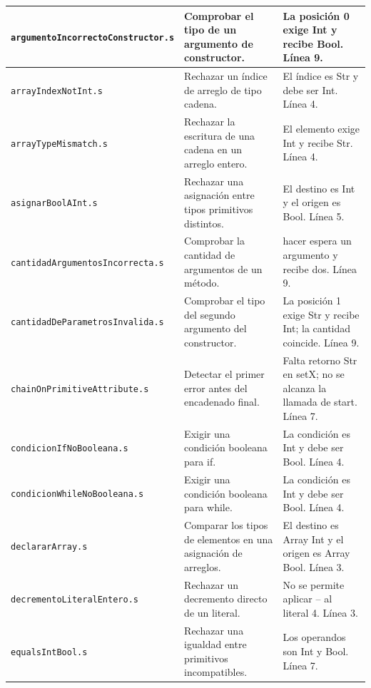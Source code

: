 \begin{longtable}{|>{\raggedright\arraybackslash}p{}|>{\raggedright\arraybackslash}p{}|>{\raggedright\arraybackslash}p{}|}
\texttt{argumento\allowbreak Incorrecto\allowbreak Constructor.s} & Comprobar el tipo de un argumento de constructor. & La posición 0 exige Int y recibe Bool. Línea 9. \\ \hline
\texttt{array\allowbreak Index\allowbreak Not\allowbreak Int.s} & Rechazar un índice de arreglo de tipo cadena. & El índice es Str y debe ser Int. Línea 4. \\ \hline
\texttt{array\allowbreak Type\allowbreak Mismatch.s} & Rechazar la escritura de una cadena en un arreglo entero. & El elemento exige Int y recibe Str. Línea 4. \\ \hline
\texttt{asignar\allowbreak Bool\allowbreak AInt.s} & Rechazar una asignación entre tipos primitivos distintos. & El destino es Int y el origen es Bool. Línea 5. \\ \hline
\texttt{cantidad\allowbreak Argumentos\allowbreak Incorrecta.s} & Comprobar la cantidad de argumentos de un método. & hacer espera un argumento y recibe dos. Línea 9. \\ \hline
\texttt{cantidad\allowbreak De\allowbreak Parametros\allowbreak Invalida.s} & Comprobar el tipo del segundo argumento del constructor. & La posición 1 exige Str y recibe Int; la cantidad coincide. Línea 9. \\ \hline
\texttt{chain\allowbreak On\allowbreak Primitive\allowbreak Attribute.s} & Detectar el primer error antes del encadenado final. & Falta retorno Str en setX; no se alcanza la llamada de start. Línea 7. \\ \hline
\texttt{condicion\allowbreak If\allowbreak No\allowbreak Booleana.s} & Exigir una condición booleana para if. & La condición es Int y debe ser Bool. Línea 4. \\ \hline
\texttt{condicion\allowbreak While\allowbreak No\allowbreak Booleana.s} & Exigir una condición booleana para while. & La condición es Int y debe ser Bool. Línea 4. \\ \hline
\texttt{declarar\allowbreak Array.s} & Comparar los tipos de elementos en una asignación de arreglos. & El destino es Array Int y el origen es Array Bool. Línea 3. \\ \hline
\texttt{decremento\allowbreak Literal\allowbreak Entero.s} & Rechazar un decremento directo de un literal. & No se permite aplicar -- al literal 4. Línea 3. \\ \hline
\texttt{equals\allowbreak Int\allowbreak Bool.s} & Rechazar una igualdad entre primitivos incompatibles. & Los operandos son Int y Bool. Línea 7. \\ \hline

\end{longtable}
